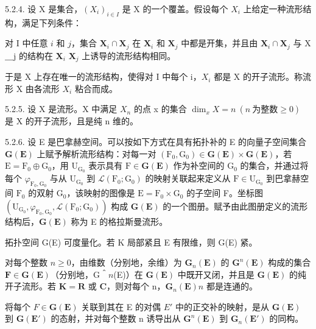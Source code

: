5.2.4. 设 X 是集合，\((X_{i})_{i\in I}\) 是 X 的一个覆盖。假设每个 \(X_{i}\) 上给定一种流形结构，满足下列条件：

对 I 中任意 \(i\) 和 \(j\)，集合 \(\mathbf{X}_{i} \cap \mathbf{X}_{j}\) 在 \(\mathbf{X}_{i}\) 和 \(\mathbf{X}_{j}\) 中都是开集，并且由 \(\mathbf{X}_{i} \cap \mathbf{X}_{j}\) 与 X＿j 的结构在 \(\mathbf{X}_{i}\)  \(\mathbf{X}_{j}\) 上诱导的流形结构相同。

于是 X 上存在唯一的流形结构，使得对 I 中每个 i，\(X_{i}\) 都是 X 的开子流形。称流形 X 由各流形 \(X_{i}\) 粘合而成。

5.2.5. 设 X 是流形。X 中满足 \(X_{n}\) 的点 x 的集合 \(\dim_{x}X=n\ (n\ \text{为整数}\geqslant0)\) 是 X 的开子流形，且是纯 n 维的。

5.2.6. 设 E 是巴拿赫空间。可以按如下方式在具有拓扑补的 E 的向量子空间集合 \(\mathbf{G}(\mathbf{E})\) 上赋予解析流形结构：对每一对 \((\mathrm{F}_0, \mathrm{G}_0) \in \mathbf{G}(\mathbf{E}) \times \mathbf{G}(\mathbf{E})\)，若 \(\mathrm{E} = \mathrm{F}_0 \oplus \mathrm{G}_0\)，用 \(\mathrm{U}_{\mathrm{G}_0}\) 表示具有 \(\mathrm{F} \in \mathbf{G}(\mathbf{E})\) 作为补空间的 \(\mathrm{G}_0\) 的集合，并通过将每个 \(\varphi_{\mathrm{F}_0, \mathrm{G}_0}\) 与从 \(\mathrm{U}_{\mathrm{G}_0}\) 到 \(\mathcal{L}(\mathrm{F}_0; \mathrm{G}_0)\) 的映射关联起来定义从 \(\mathrm{F} \in \mathrm{U}_{\mathrm{G}_0}\) 到巴拿赫空间 \(\mathrm{F}_0\) 的双射 \(\mathrm{G}_0\)，该映射的图像是 \(\mathrm{E} = \mathrm{F}_0 \times \mathrm{G}_0\) 的子空间 F。坐标图 \((\mathrm{U}_{\mathrm{G}_0}, \varphi_{\mathrm{F}_0, \mathrm{G}_0}, \mathcal{L}(\mathrm{F}_0; \mathrm{G}_0))\) 构成 \(\mathbf{G}(\mathbf{E})\) 的一个图册。赋予由此图册定义的流形结构后，\(\mathbf{G}(\mathbf{E})\) 称为 E 的格拉斯曼流形。

拓扑空间 G(E) 可度量化。若 K 局部紧且 E 有限维，则 G(E) 紧。

对每个整数 \(n \geqslant 0\)，由维数（分别地，余维）为 \(\mathbf{G}_{n}(\mathbf{E})\) 的 \(\mathbf{G}^{n}(\mathbf{E})\) 构成的集合 \(\mathbf{F} \in \mathbf{G}(\mathbf{E})\)（分别地，G＾\(n\)(E)）在 \(\mathbf{G}(\mathbf{E})\) 中既开又闭，并且是 \(\mathbf{G}(\mathbf{E})\) 的纯开子流形。若 \(\mathbf{K} = \mathbf{R}\) 或 \(\mathbf{C}\)，则对每个 n，\(\mathbf{G}_{n}(\mathbf{E})\)\(n\) 都是连通的。

将每个 \(F \in \mathbf{G}(\mathbf{E})\) 关联到其在 E 的对偶 \(E'\) 中的正交补的映射，是从 \(\mathbf{G}(\mathbf{E})\) 到 \(\mathbf{G}(\mathbf{E}')\) 的态射，并对每个整数 n 诱导出从 \(\mathbf{G}^{n}(\mathbf{E})\) 到 \(\mathbf{G}_{n}(\mathbf{E}')\) 的同构。

